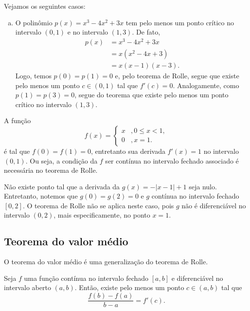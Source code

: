 \begin{ex}
  Vejamos os seguintes casos:
  \begin{enumerate}[a)]
  \item O polinômio $p(x) = x^3 - 4x^2 + 3x$ tem pelo menos um ponto crítico no intervalo $(0,1)$ e no intervalo $(1,3)$. De fato,
    \begin{align}
      p(x) &= x^3 - 4x^2 + 3x\\
           &= x(x^2 - 4x + 3)\\
           &= x(x-1)(x-3).
    \end{align}
    Logo, temos $p(0)=p(1)=0$ e, pelo teorema de Rolle, segue que existe pelo menos um ponto $c\in (0, 1)$ tal que $f'(c)=0$. Analogamente, como $p(1)=p(3)=0$, segue do teorema que existe pelo menos um ponto crítico no intervalo $(1,3)$.
  \end{enumerate}
\item A função
  \begin{equation}
    f(x) = \left\{
      \begin{array}{ll}
        x &, 0\leq x < 1,\\
        0 &, x=1.
      \end{array}
\right.
\end{equation}
é tal que $f(0)=f(1)=0$, entretanto sua derivada $f'(x)=1$ no intervalo $(0, 1)$. Ou seja, a condição da $f$ ser contínua no intervalo fechado associado é necessária no teorema de Rolle.
\item Não existe ponto tal que a derivada da $g(x)=-|x-1|+1$ seja nulo. Entretanto, notemos que $g(0)=g(2)=0$ e $g$ contínua no intervalo fechado $[0, 2]$. O teorema de Rolle não se aplica neste caso, pois $g$ não é diferenciável no intervalo $(0,2)$, mais especificamente, no ponto $x=1$.
\end{ex}

\subsection{Teorema do valor médio}

O teorema do valor médio é uma generalização do teorema de Rolle.

\begin{teo}
  Seja $f$ uma função contínua no intervalo fechado $[a,b]$ e diferenciável no intervalo aberto $(a,b)$. Então, existe pelo menos um ponto $c\in (a,b)$ tal que
  \begin{equation}
    \frac{f(b)-f(a)}{b-a}=f'(c).
  \end{equation}
\end{teo}

